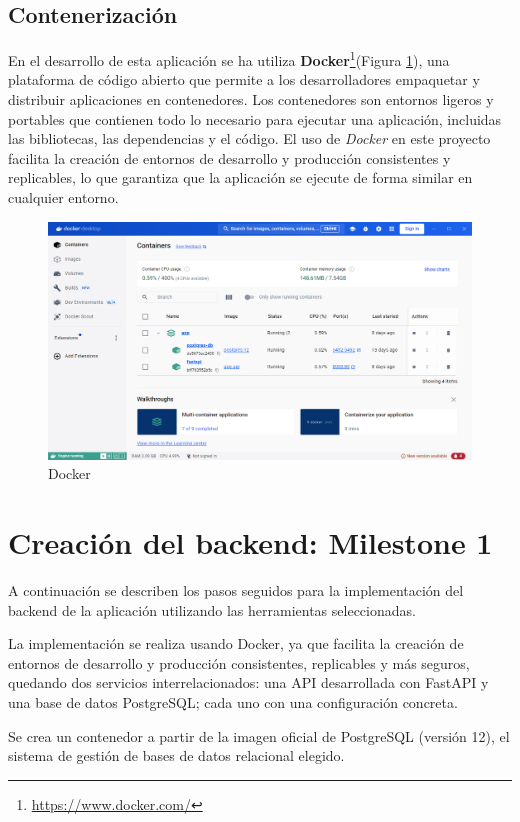 \subsection{Contenerización}
En el desarrollo de esta aplicación se ha utiliza \textbf{Docker}\footnote{\url{https://www.docker.com/}}(Figura \ref{fig:docker}), una plataforma de código abierto que permite a los desarrolladores empaquetar y distribuir aplicaciones en contenedores. Los contenedores son entornos ligeros y portables que contienen todo lo necesario para ejecutar una aplicación, incluidas las bibliotecas, las dependencias y el código. El uso de \textit{Docker} en este proyecto facilita la creación de entornos de desarrollo y producción consistentes y replicables, lo que garantiza que la aplicación se ejecute de forma similar en cualquier entorno.
\begin{figure}[ht!]
    \centering
    \includegraphics[width=\linewidth]{imagenes/docker.png}
    \caption{Docker}
    \label{fig:docker}
\end{figure}


\section{Creación del backend: Milestone 1}\label{chap:milestone1}
A continuación se describen los pasos seguidos para la implementación del backend de la aplicación utilizando las herramientas seleccionadas.

La implementación se realiza usando Docker, ya que facilita la creación de entornos de desarrollo y producción consistentes, replicables y más seguros, quedando dos servicios interrelacionados: una API desarrollada con FastAPI y una base de datos PostgreSQL; cada uno con una configuración concreta. 

Se crea un contenedor a partir de la imagen oficial de PostgreSQL (versión 12), el sistema de gestión de bases de datos relacional elegido.

